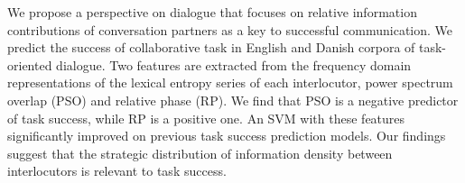 We propose a perspective on dialogue that focuses on relative information contributions of conversation partners as a key to successful communication. We predict the success of collaborative task in English and Danish corpora of task-oriented dialogue. Two features are extracted from the frequency domain representations of  the lexical entropy series of each interlocutor, power spectrum overlap (PSO) and relative phase (RP). We find that PSO is a negative predictor of task success, while RP is a positive one. An SVM with these features significantly improved on previous task success prediction models. Our findings suggest that the strategic distribution of information density between interlocutors  is relevant to task success.
